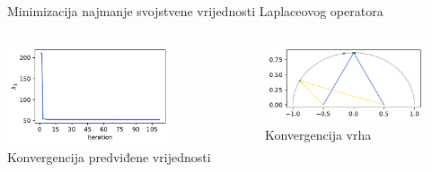 \documentclass[croatian, 12pt, usepdftitle = false, xcolor = {{usenames, dvipsnames, svgnames, x11names}}, hyperref = {unicode}]{beamer}
\begin{document}
\begin{frame}{Minimizacija najmanje svojstvene vrijednosti Laplaceovog operatora}
{            \centering
            \begin{columns}
                \begin{column}{0.5\textwidth}
                    \centering
                    \includegraphics[width = 48mm]{figures/polynomial_4_minimisation_values.pdf}
                    \\
                    Konvergencija predviđene vrijednosti
                \end{column}
                \begin{column}{0.5\textwidth}
                    \centering
                    \includegraphics[width = 47mm]{figures/polynomial_4_minimisation_vertices.pdf}
                    \\
                    Konvergencija vrha
                \end{column}
            \end{columns}%
        }%
\end{frame}
\end{document}
